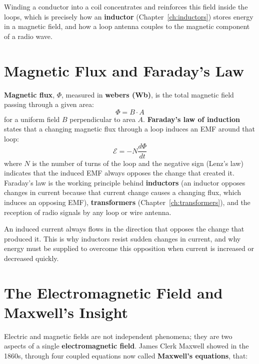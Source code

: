 Winding a conductor into a coil concentrates and reinforces this field
inside the loops, which is precisely how an \textbf{inductor}
(Chapter~\ref{ch:inductors}) stores energy in a magnetic field, and how a
loop antenna couples to the magnetic component of a radio wave.

\begin{center}
\end{center}

\section{Magnetic Flux and Faraday's Law}

\textbf{Magnetic flux}, $\Phi$, measured in \textbf{webers (Wb)}, is the
total magnetic field passing through a given area:
\[
\Phi = B \cdot A
\]
for a uniform field $B$ perpendicular to area $A$. \textbf{Faraday's law of
induction} states that a changing magnetic flux through a loop induces an
EMF around that loop:
\[
\mathcal{E} = -N\frac{d\Phi}{dt}
\]
where $N$ is the number of turns of the loop and the negative sign (Lenz's
law) indicates that the induced EMF always opposes the change that
created it. Faraday's law is the working principle behind
\textbf{inductors} (an inductor opposes changes in current because that
current change causes a changing flux, which induces an opposing EMF),
\textbf{transformers} (Chapter~\ref{ch:transformers}), and the reception
of radio signals by any loop or wire antenna.

\begin{keyidea}
An induced current always flows in the direction that opposes the change
that produced it. This is why inductors resist sudden changes in
current, and why energy must be supplied to overcome this opposition when
current is increased or decreased quickly.
\end{keyidea}

\section{The Electromagnetic Field and Maxwell's Insight}

Electric and magnetic fields are not independent phenomena; they are two
aspects of a single \textbf{electromagnetic field}. James Clerk Maxwell
showed in the 1860s, through four coupled equations now called
\textbf{Maxwell's equations}, that:

